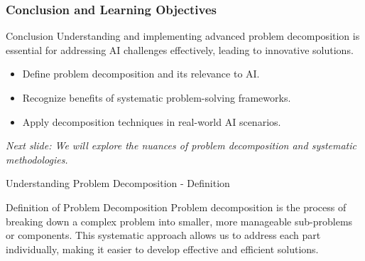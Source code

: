 \documentclass[aspectratio=169]{beamer}
\begin{document}
\begin{frame}[fragile]
    \frametitle{Conclusion and Learning Objectives}
    
    \begin{block}{Conclusion}
        Understanding and implementing advanced problem decomposition is essential for addressing AI challenges effectively, leading to innovative solutions.
    \end{block}
    
    \begin{itemize}
        \item Define problem decomposition and its relevance to AI.
        \item Recognize benefits of systematic problem-solving frameworks.
        \item Apply decomposition techniques in real-world AI scenarios.
    \end{itemize}

    \textit{Next slide: We will explore the nuances of problem decomposition and systematic methodologies.}
\end{frame}

\begin{frame}[fragile]{Understanding Problem Decomposition - Definition}
    \begin{block}{Definition of Problem Decomposition}
        Problem decomposition is the process of breaking down a complex problem into smaller, more manageable sub-problems or components. This systematic approach allows us to address each part individually, making it easier to develop effective and efficient solutions.
    \end{block}
\end{frame}
\end{document}

